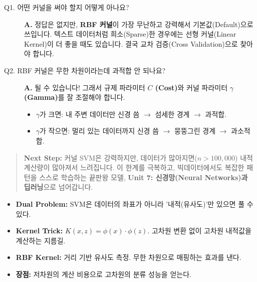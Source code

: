 \documentclass[11pt,a4paper]{book}
\theoremstyle{definition}
\begin{document}
\begin{description}
    \item[Q1. 어떤 커널을 써야 할지 어떻게 아나요?]
    \textbf{A.} 정답은 없지만, \textbf{RBF 커널}이 가장 무난하고 강력해서 기본값(Default)으로 쓰입니다. 텍스트 데이터처럼 희소(Sparse)한 경우에는 선형 커널(Linear Kernel)이 더 좋을 때도 있습니다. 결국 교차 검증(Cross Validation)으로 찾아야 합니다.
    
    \item[Q2. RBF 커널은 무한 차원이라는데 과적합 안 되나요?]
    \textbf{A.} 될 수 있습니다! 그래서 규제 파라미터 \textbf{$C$ (Cost)}와 커널 파라미터 \textbf{$\gamma$ (Gamma)}를 잘 조절해야 합니다.
    \begin{itemize}
        \item $\gamma$가 크면: 내 주변 데이터만 신경 씀 $\rightarrow$ 섬세한 경계 $\rightarrow$ 과적합.
        \item $\gamma$가 작으면: 멀리 있는 데이터까지 신경 씀 $\rightarrow$ 뭉뚱그린 경계 $\rightarrow$ 과소적합.
    \end{itemize}
\end{description}

\vspace{1cm}
\begin{quote}
\textbf{Next Step:} 커널 SVM은 강력하지만, 데이터가 많아지면($n > 100,000$) 내적 계산량이 많아져서 느려집니다. 이 한계를 극복하고, 빅데이터에서도 복잡한 패턴을 스스로 학습하는 끝판왕 모델, \textbf{Unit 7: 신경망(Neural Networks)과 딥러닝}으로 넘어갑니다.
\end{quote}

\begin{summarybox}[title={Unit 6 핵심 요약}]
\begin{itemize}
    \item \textbf{Dual Problem:} SVM은 데이터의 좌표가 아니라 '내적(유사도)'만 있으면 풀 수 있다.
    \item \textbf{Kernel Trick:} $K(x, z) = \phi(x) \cdot \phi(z)$. 고차원 변환 없이 고차원 내적값을 계산하는 지름길.
    \item \textbf{RBF Kernel:} 거리 기반 유사도 측정. 무한 차원으로 매핑하는 효과를 낸다.
    \item \textbf{장점:} 저차원의 계산 비용으로 고차원의 분류 성능을 얻는다.
\end{itemize}
\end{summarybox}


\end{document}
